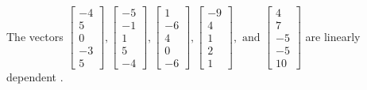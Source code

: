\begin{exercise}
\begin{exerciseStatement}
  \end{exerciseStatement}
  \begin{exerciseAnswer}
   The vectors \(\left[\begin{array}{r}
-4 \\
5 \\
0 \\
-3 \\
5
\end{array}\right] , \left[\begin{array}{r}
-5 \\
-1 \\
1 \\
5 \\
-4
\end{array}\right] , \left[\begin{array}{r}
1 \\
-6 \\
4 \\
0 \\
-6
\end{array}\right] , \left[\begin{array}{r}
-9 \\
4 \\
1 \\
2 \\
1
\end{array}\right] , \text{ and } \left[\begin{array}{r}
4 \\
7 \\
-5 \\
-5 \\
10
\end{array}\right]\) are 
  	 linearly dependent  .
  


  \end{exerciseAnswer}
\end{exercise}